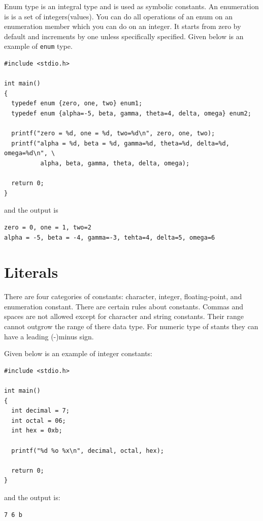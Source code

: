 Enum type is an integral type and is used as symbolic constants. An enumeration
is is a set of integers(values). You can do all operations of an enum on an
enumeration member which you can do on an integer. It starts from zero by
default and increments by one unless specifically specified. Given below is an
example of \texttt{enum} type.

\begin{Verbatim}[frame=single]
#include <stdio.h>

int main()
{
  typedef enum {zero, one, two} enum1;
  typedef enum {alpha=-5, beta, gamma, theta=4, delta, omega} enum2;

  printf("zero = %d, one = %d, two=%d\n", zero, one, two);
  printf("alpha = %d, beta = %d, gamma=%d, theta=%d, delta=%d, omega=%d\n", \
          alpha, beta, gamma, theta, delta, omega);

  return 0;
}
\end{Verbatim}

and the output is

\begin{Verbatim}[frame=single]
zero = 0, one = 1, two=2
alpha = -5, beta = -4, gamma=-3, tehta=4, delta=5, omega=6
\end{Verbatim}

\section{Literals}
There are four categories of constants: character, integer, floating-point, and
enumeration constant. There are certain rules about constants. Commas and
spaces are not allowed except for character and string constants. Their range
cannot outgrow the range of there data type. For numeric type of stants they
can have a leading (-)minus sign.

Given below is an example of integer constants:

\begin{Verbatim}[frame=single]
#include <stdio.h>

int main()
{
  int decimal = 7;
  int octal = 06;
  int hex = 0xb;

  printf("%d %o %x\n", decimal, octal, hex);

  return 0;
}
\end{Verbatim}

and the output is:

\begin{Verbatim}[frame=single]
7 6 b
\end{Verbatim}

